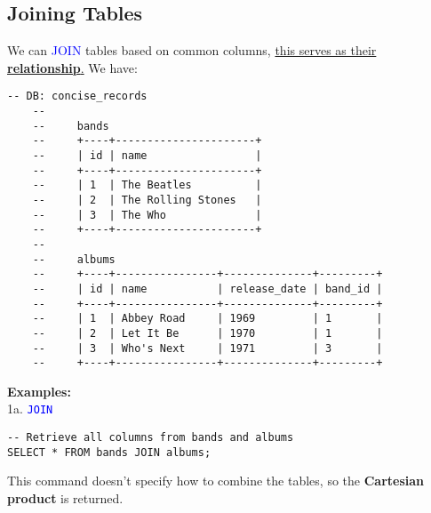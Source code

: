 \subsection{Joining Tables}
We can \textcolor{blue}{JOIN} tables based on common columns, \underline{this serves as their \textbf{relationship}.} We have:
\begin{lstlisting}[style=sql]
    -- DB: concise_records
    --
    --     bands
    --     +----+----------------------+
    --     | id | name                 |
    --     +----+----------------------+
    --     | 1  | The Beatles          |
    --     | 2  | The Rolling Stones   |
    --     | 3  | The Who              |
    --     +----+----------------------+
    --
    --     albums
    --     +----+----------------+--------------+---------+
    --     | id | name           | release_date | band_id |
    --     +----+----------------+--------------+---------+
    --     | 1  | Abbey Road     | 1969         | 1       |
    --     | 2  | Let It Be      | 1970         | 1       |
    --     | 3  | Who's Next     | 1971         | 3       |
    --     +----+----------------+--------------+---------+
\end{lstlisting}

\noindent
\textbf{Examples:}\\
1a. \textcolor{blue}{\texttt{JOIN}}

\begin{lstlisting}[style=sql]
-- Retrieve all columns from bands and albums
SELECT * FROM bands JOIN albums;
\end{lstlisting}
This command doesn't specify how to combine the tables, so the \textbf{Cartesian product} is returned.\\

